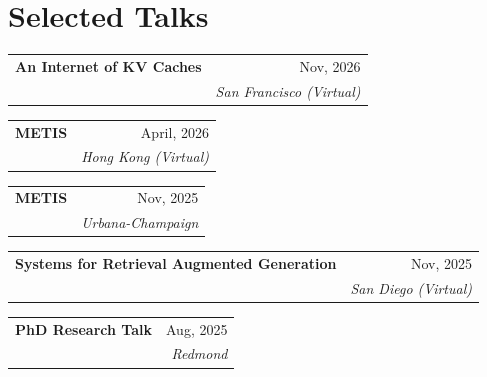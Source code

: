 \section{Selected Talks}

\begingroup
\newcommand{\talkentry}[5]{%
  \par\needspace{2\baselineskip}%
  \begin{tabularx}{\linewidth}{@{}>{\raggedright\arraybackslash}X@{\hspace{1em}}r@{}}
    \textbf{#2} & #1 \\
    {\fontsize{9}{10.5}\selectfont
      \ifstrempty{#4}{\textit{(#3)}}{\iconlink{#4}{\textit{(#3)}}}} & {\fontsize{9}{10.5}\selectfont\itshape #5}
  \end{tabularx}\par\addvspace{2pt}%
}
\talkentry{Nov, 2026}{An Internet of KV Caches}{Net4AI, IETF127}{https://datatracker.ietf.org/meeting/127/agenda/}{San Francisco (Virtual)}
\talkentry{April, 2026}{METIS}{NAISS Lab Seminar, HKU}{https://naisslab.github.io/}{Hong Kong (Virtual)}
\talkentry{Nov, 2025}{METIS}{Systems Research Seminar, UIUC}{https://systems-seminar-uiuc.github.io/fall25/}{Urbana-Champaign}
\talkentry{Nov, 2025}{Systems for Retrieval Augmented Generation}{Systems for LLMs and AI Agents Class, UCSD}{https://cseweb.ucsd.edu/~yiying/cse291a-fall25/reading/}{San Diego (Virtual)}
\talkentry{Aug, 2025}{PhD Research Talk}{Networking Research Group, Microsoft Research}{}{Redmond}
\endgroup
